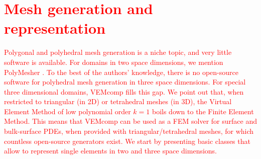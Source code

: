 \documentclass[a4paper]{article}
\newcommand{\red}[1]{\textcolor{red}{#1}}
\begin{document}
\section{\red{Mesh generation and representation}}
\label{sec:mesh_generation}

\red{Polygonal and polyhedral mesh generation is a niche topic, and very little software is available.  For domains in two space dimensions, we mention PolyMesher \cite{Talischi_2012}. To the best of the authors' knowledge, there is no open-source software for polyhedral mesh generation in three space dimensions. For special three dimensional domains,  VEMcomp fills this gap. We point out that, when restricted to triangular (in 2D) or tetrahedral meshes (in 3D), the Virtual Element Method of low polynomial order $k=1$ boils down to the Finite Element Method. This means that VEMcomp can be used as a FEM solver for surface and bulk-surface PDEs, when provided with triangular/tetrahedral meshes,  for which countless open-source generators exist.  We start by presenting basic classes that allow to represent single elements in two and three space dimensions. }
\end{document}
